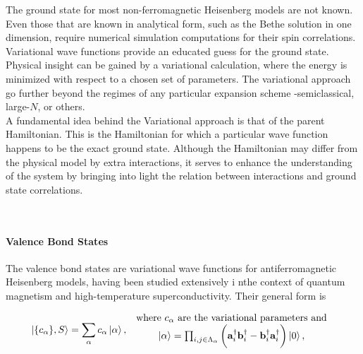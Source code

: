\documentclass{homework}
\begin{document}
\begin{tcolorbox}[colback = my-blue, title = Physical Context]

The ground state for most non-ferromagnetic Heisenberg models are not known. Even those that are known in analytical form, such as the Bethe solution in one dimension, require numerical simulation computations for their spin correlations. Variational wave functions provide an educated guess for the ground state. Physical insight can be gained by a variational calculation, where the energy is minimized with respect to a chosen set of parameters. The variational approach go further beyond the regimes of any particular expansion scheme -semiclassical, large-$N$, or others. \\

A fundamental idea behind the Variational approach is that of the parent Hamiltonian. This is the Hamiltonian for which a particular wave function happens to be the exact ground state. Although the Hamiltonian may differ from the physical model by extra interactions, it serves to enhance the understanding of the system by bringing into light the relation between interactions and ground state correlations. \\

\end{tcolorbox}

\blanky \\

\paragraph{\textbf{Valence Bond States}}

The valence bond states are variational wave functions for antiferromagnetic Heisenberg models, having been studied extensively i nthe context of quantum magnetism and high-temperature superconductivity. Their general form is 

\begin{equation}
    \ket{\{c_{\alpha}\}, S} = \sum_{\alpha} c_{\alpha} \ket{\alpha}, \begin{array}{c}
         \textnormal{ where $c_{\alpha}$ are the variational parameters and }  \\
         \ket{\alpha} = \prod_{i,j \in \Lambda_{\alpha}} \bigg({\bf a}_i^\dagger {\bf b}_i^\dagger - {\bf b}_i^\dagger {\bf a}_i^\dagger \bigg) \ket{0},
    \end{array}
    \label{Valence_bond_states}
\end{equation}
\end{document}
